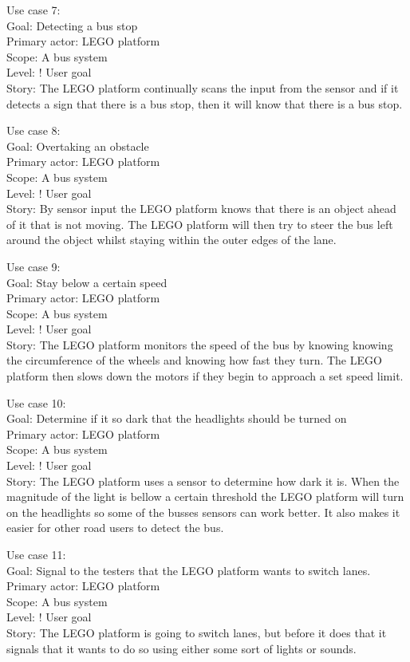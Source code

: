 Use case 7:\\
Goal: Detecting a bus stop\\
Primary actor: LEGO platform\\
Scope: A bus system\\
Level: ! User goal\\
Story: The LEGO platform continually scans the input from the sensor and if it detects a sign that there is a bus stop, then it will know that there is a bus stop.

Use case 8:\\
Goal: Overtaking an obstacle\\
Primary actor: LEGO platform\\
Scope: A bus system\\
Level: ! User goal\\
Story: By sensor input the LEGO platform knows that there is an object ahead of it that is not moving. The LEGO platform will then try to steer the bus left around the object whilst staying within the outer edges of the lane.

Use case 9:\\
Goal: Stay below a certain speed\\
Primary actor: LEGO platform\\
Scope: A bus system\\
Level: ! User goal\\
Story: The LEGO platform monitors the speed of the bus by knowing knowing the circumference of the wheels and knowing how fast they turn. The LEGO platform then slows down the motors if they begin to approach a set speed limit.

Use case 10:\\
Goal: Determine if it so dark that the headlights should be turned on\\
Primary actor: LEGO platform\\
Scope: A bus system\\
Level: ! User goal\\
Story: The LEGO platform uses a sensor to determine how dark it is. When the magnitude of the light is bellow a certain threshold the LEGO platform will turn on the headlights so some of the busses sensors can work better. It also makes it easier for other road users to detect the bus.

Use case 11:\\
Goal: Signal to the testers that the LEGO platform wants to switch lanes.\\
Primary actor: LEGO platform\\
Scope: A bus system\\
Level: ! User goal\\
Story: The LEGO platform is going to switch lanes, but before it does that it signals that it wants to do so using either some sort of lights or sounds.

